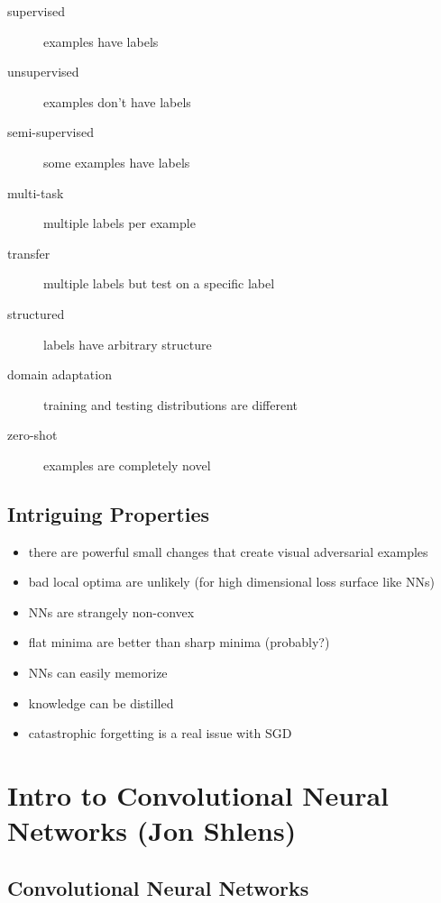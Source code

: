 \documentclass[]{article}
\theoremstyle{definition}
\begin{document}
    \begin{description}
        \item[supervised] examples have labels
        \item[unsupervised] examples don't have labels
        \item[semi-supervised] some examples have labels
        \item[multi-task] multiple labels per example
        \item[transfer] multiple labels but test on a specific label
        \item[structured] labels have arbitrary structure
        \item[domain adaptation] training and testing distributions are different
        \item[zero-shot] examples are completely novel
    \end{description}

    \subsection{Intriguing Properties}%
    \label{sub:intriguing_properties}

    \begin{itemize}
        \item there are powerful small changes that create visual adversarial examples
        \item bad local optima are unlikely (for high dimensional loss surface like NNs)
        \item NNs are strangely non-convex
        \item flat minima are better than sharp minima (probably?)
        \item NNs can easily memorize
        \item knowledge can be distilled
        \item catastrophic forgetting is a real issue with SGD
    \end{itemize}

    \section{Intro to Convolutional Neural Networks {\small(Jon Shlens)}}%
    \label{sec:introduction_to_cnns_small_jonathan_shlens_}

    \subsection{Convolutional Neural Networks}%
    \label{sub:convolutional_neural_networks}
\end{document}
